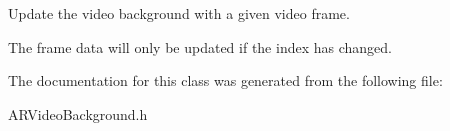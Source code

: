 Update the video background with a given video frame. 

The frame data will only be updated if the index has changed. 

The documentation for this class was generated from the following file:\begin{DoxyCompactItemize}
\item 
ARVideoBackground.h\end{DoxyCompactItemize}
